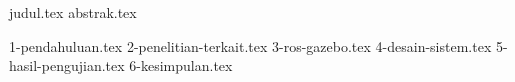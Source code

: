 \documentclass[conference]{IEEEtran}[2015/08/26]
\begin{document}
  {judul.tex}
  {abstrak.tex}

  {1-pendahuluan.tex}
  {2-penelitian-terkait.tex}
  {3-ros-gazebo.tex}
  {4-desain-sistem.tex}
  {5-hasil-pengujian.tex}
  {6-kesimpulan.tex}

  \balance

  
  
\end{document}
